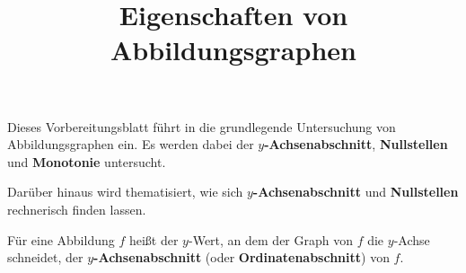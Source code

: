 \documentclass[]{uebungsblatt}
\title{Eigenschaften von Abbildungsgraphen}
\begin{document}
\maketitle
\begin{contents}
    Dieses Vorbereitungsblatt führt in die grundlegende Untersuchung von Abbildungsgraphen ein. Es werden dabei der \textbf{$y$-Achsenabschnitt}, \textbf{Nullstellen} und \textbf{Monotonie} untersucht. 
    
    Darüber hinaus wird thematisiert, wie sich \textbf{$y$-Achsenabschnitt} und \textbf{Nullstellen} rechnerisch finden lassen.
\end{contents}

\begin{definition}
    Für eine Abbildung $f$ heißt der $y$-Wert, an dem der Graph von $f$ die $y$-Achse schneidet, der \textbf{$y$-Achsenabschnitt} (oder \textbf{Ordinatenabschnitt}) von $f$.
\end{definition}
\end{document}
